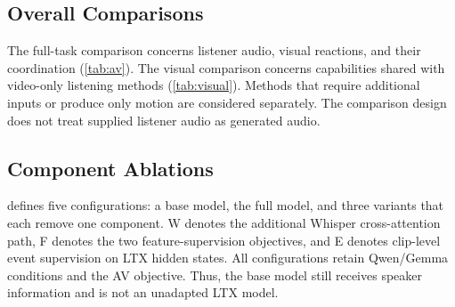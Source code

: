 \subsection{Overall Comparisons}
The full-task comparison concerns listener audio, visual reactions, and their coordination (\cref{tab:av}). The visual comparison concerns capabilities shared with video-only listening methods (\cref{tab:visual}). Methods that require additional inputs or produce only motion are considered separately. The comparison design does not treat supplied listener audio as generated audio.



\subsection{Component Ablations}
 defines five configurations: a base model, the full model, and three variants that each remove one component. W denotes the additional Whisper cross-attention path, F denotes the two feature-supervision objectives, and E denotes clip-level event supervision on LTX hidden states. All configurations retain Qwen/Gemma conditions and the AV objective. Thus, the base model still receives speaker information and is not an unadapted LTX model.

